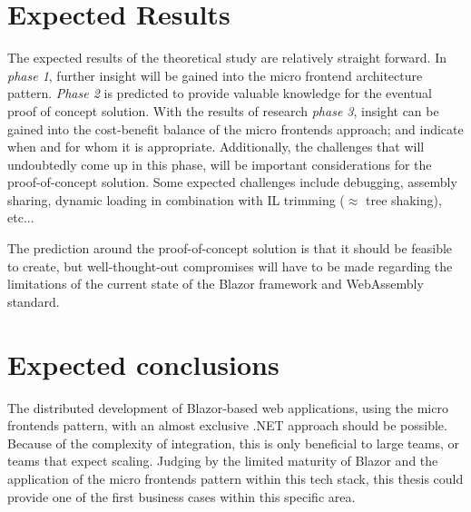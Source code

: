 
\section{Expected Results}
\label{sec:expected-results}


The expected results of the theoretical study are relatively straight forward.
In \textit{phase 1}, further insight will be gained into the micro frontend
architecture pattern. \textit{Phase 2} is predicted to provide valuable
knowledge for the eventual proof of concept solution. With the results of
research \textit{phase 3}, insight can be gained into the cost-benefit balance
of the micro frontends approach; and indicate when and for whom it is
appropriate. Additionally, the challenges that will undoubtedly come up in this
phase, will be important considerations for the proof-of-concept solution. Some
expected challenges include debugging, assembly sharing, dynamic loading in
combination with IL trimming ($\approx$ tree shaking), etc...

The prediction around the proof-of-concept solution is that it should be
feasible to create, but well-thought-out compromises will have to be made
regarding the limitations of the current state of the Blazor framework and
WebAssembly standard.


\section{Expected conclusions}
\label{sec:expected-conclusions}


The distributed development of Blazor-based web applications, using the micro
frontends pattern, with an almost exclusive .NET approach should be possible.
Because of the complexity of integration, this is only beneficial to large
teams, or teams that expect scaling. Judging by the limited maturity of Blazor
and the application of the micro frontends pattern within this tech stack, this
thesis could provide one of the first business cases within this specific area.